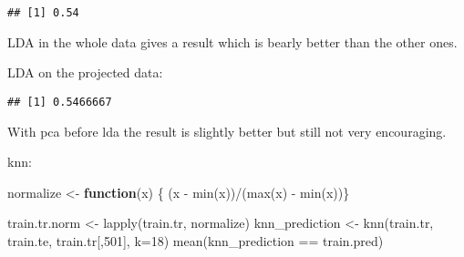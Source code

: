 \documentclass[
]{article}
\newenvironment{Shaded}{\begin{snugshade}}{\end{snugshade}}
\newcommand{\AttributeTok}[1]{\textcolor[rgb]{0.77,0.63,0.00}{#1}}
\newcommand{\ControlFlowTok}[1]{\textcolor[rgb]{0.13,0.29,0.53}{\textbf{#1}}}
\newcommand{\DecValTok}[1]{\textcolor[rgb]{0.00,0.00,0.81}{#1}}
\newcommand{\FunctionTok}[1]{\textcolor[rgb]{0.00,0.00,0.00}{#1}}
\newcommand{\NormalTok}[1]{#1}
\newcommand{\OtherTok}[1]{\textcolor[rgb]{0.56,0.35,0.01}{#1}}
\newcommand{\SpecialCharTok}[1]{\textcolor[rgb]{0.00,0.00,0.00}{#1}}
\begin{document}
\begin{verbatim}
## [1] 0.54
\end{verbatim}

LDA in the whole data gives a result which is bearly better than the
other ones.

LDA on the projected data:

\begin{Shaded}
\end{Shaded}

\begin{verbatim}
## [1] 0.5466667
\end{verbatim}

With pca before lda the result is slightly better but still not very
encouraging.

knn:

\begin{Shaded}
\begin{Highlighting}[]
\NormalTok{normalize }\OtherTok{\textless{}{-}} \ControlFlowTok{function}\NormalTok{(x) \{ (x }\SpecialCharTok{{-}} \FunctionTok{min}\NormalTok{(x))}\SpecialCharTok{/}\NormalTok{(}\FunctionTok{max}\NormalTok{(x) }\SpecialCharTok{{-}} \FunctionTok{min}\NormalTok{(x))\}}
\end{Highlighting}
\end{Shaded}

\begin{Shaded}
\begin{Highlighting}[]
\NormalTok{train.tr.norm }\OtherTok{\textless{}{-}} \FunctionTok{lapply}\NormalTok{(train.tr, normalize)}
\NormalTok{knn\_prediction }\OtherTok{\textless{}{-}} \FunctionTok{knn}\NormalTok{(train.tr, train.te, train.tr[,}\DecValTok{501}\NormalTok{], }\AttributeTok{k=}\DecValTok{18}\NormalTok{)}
\FunctionTok{mean}\NormalTok{(knn\_prediction }\SpecialCharTok{==}\NormalTok{ train.pred)}
\end{Highlighting}
\end{Shaded}
\end{document}
